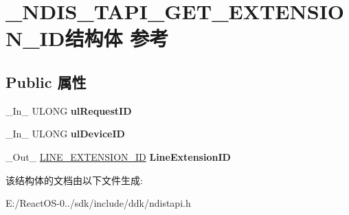 \hypertarget{struct___n_d_i_s___t_a_p_i___g_e_t___e_x_t_e_n_s_i_o_n___i_d}{}\section{\+\_\+\+N\+D\+I\+S\+\_\+\+T\+A\+P\+I\+\_\+\+G\+E\+T\+\_\+\+E\+X\+T\+E\+N\+S\+I\+O\+N\+\_\+\+I\+D结构体 参考}
\label{struct___n_d_i_s___t_a_p_i___g_e_t___e_x_t_e_n_s_i_o_n___i_d}
\subsection*{Public 属性}
\begin{DoxyCompactItemize}
\item 
\mbox{\label{struct___n_d_i_s___t_a_p_i___g_e_t___e_x_t_e_n_s_i_o_n___i_d_a47ad399ce552155c4d6f32be03c499e8}} 
\+\_\+\+In\+\_\+ U\+L\+O\+NG {\bfseries ul\+Request\+ID}
\item 
\mbox{\label{struct___n_d_i_s___t_a_p_i___g_e_t___e_x_t_e_n_s_i_o_n___i_d_aa804b4fc1a011d1b974dbe888435a129}} 
\+\_\+\+In\+\_\+ U\+L\+O\+NG {\bfseries ul\+Device\+ID}
\item 
\mbox{\label{struct___n_d_i_s___t_a_p_i___g_e_t___e_x_t_e_n_s_i_o_n___i_d_afe2c61b1cd0c9ac55ec0ea53661e127e}} 
\+\_\+\+Out\+\_\+ \hyperlink{struct___l_i_n_e___e_x_t_e_n_s_i_o_n___i_d}{L\+I\+N\+E\+\_\+\+E\+X\+T\+E\+N\+S\+I\+O\+N\+\_\+\+ID} {\bfseries Line\+Extension\+ID}
\end{DoxyCompactItemize}


该结构体的文档由以下文件生成\+:\begin{DoxyCompactItemize}
\item 
E\+:/\+React\+O\+S-\/0../sdk/include/ddk/ndistapi.\+h\end{DoxyCompactItemize}
